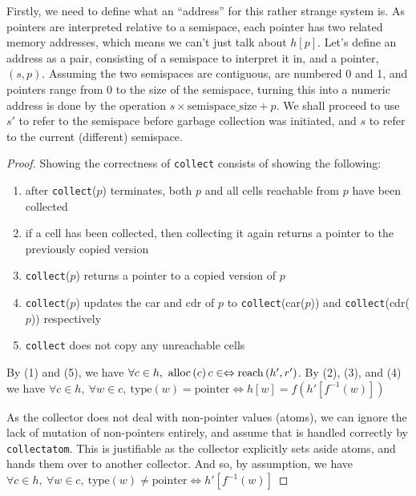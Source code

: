 Firstly, we need to define what an ``address'' for this rather strange
system is. As pointers are interpreted relative to a semispace, each
pointer has two related memory addresses, which means we can't just
talk about $h[p]$. Let's define an address as a pair, consisting of a
semispace to interpret it in, and a pointer, $(s, p)$. Assuming the
two semispaces are contiguous, are numbered 0 and 1, and pointers
range from 0 to the size of the semispace, turning this into a numeric
address is done by the operation $s \times \mathrm{semispace\_size} +
p$. We shall proceed to use $s'$ to refer to the semispace before
garbage collection was initiated, and $s$ to refer to the current
(different) semispace.

\begin{proof}
  Showing the correctness of \texttt{collect} consists of showing the
  following:

  \begin{enumerate}
  \item after \texttt{collect}($p$) terminates, both $p$ and all cells
    reachable from $p$ have been collected

  \item if a cell has been collected, then collecting it again returns
    a pointer to the previously copied version

  \item \texttt{collect}($p$) returns a pointer to a copied version of
    $p$

  \item \texttt{collect}($p$) updates the car and cdr of $p$ to
    \texttt{collect}(car($p$)) and \texttt{collect}(cdr($p$))
    respectively

  \item \texttt{collect} does not copy any unreachable cells
  \end{enumerate}

  By (1) and (5), we have $\forall c \in h,\ \alloc{c} c \in \iff
  \reach{h'}{r'}$. By (2), (3), and (4) we have $\forall c \in h,\
  \forall w \in c,\ \mathrm{type}(w) = \mathrm{pointer} \iff h[w] =
  f(h'[f^{-1}(w)])$

  As the collector does not deal with non-pointer values (atoms), we
  can ignore the lack of mutation of non-pointers entirely, and assume
  that is handled correctly by \texttt{collectatom}. This is
  justifiable as the collector explicitly sets aside atoms, and hands
  them over to another collector. And so, by assumption, we have
  $\forall c \in h,\ \forall w \in c,\ \mathrm{type}(w) \neq
  \mathrm{pointer} \iff h'[f^{-1}(w)]$
\end{proof}

